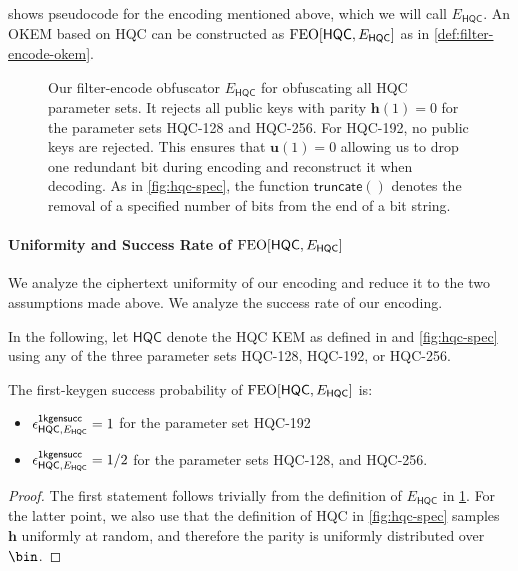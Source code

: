  shows pseudocode for the encoding mentioned above, which we will call $E_\mathsf{HQC}$. An OKEM based on HQC can be constructed as $\textsf{\textnormal{FEO}}[\mathsf{HQC}, E_\mathsf{HQC}]$ as in \cref{def:filter-encode-okem}.

\begin{figure}
    
    \caption[
        Our filter-encode obfuscator $E_\mathsf{HQC}$ for obfuscating all HQC parameter sets.
    ]{
        Our filter-encode obfuscator $E_\mathsf{HQC}$ for obfuscating all HQC parameter sets. It rejects all public keys with parity $\mathbf h(1)=0$ for the parameter sets HQC-128 and HQC-256. For HQC-192, no public keys are rejected. This ensures that $\mathbf u(1)=0$ allowing us to drop one redundant bit during encoding and reconstruct it when decoding. As in \cref{fig:hqc-spec}, the function $\mathsf{truncate}()$ denotes the removal of a specified number of bits from the end of a bit string.
    }
    \label{fig:hqc-encoding}
\end{figure}

\paragraph{Uniformity and Success Rate of $\textsf{\textnormal{FEO}}[\mathsf{HQC}, E_\mathsf{HQC}]$}

We analyze the ciphertext uniformity of our encoding and reduce it to the two assumptions made above. We analyze the success rate of our encoding.

In the following, let $\mathsf{HQC}$ denote the HQC KEM as defined in \cite{NISTPQC-R4:HQC22} and \cref{fig:hqc-spec} using any of the three parameter sets HQC-128, HQC-192, or HQC-256.

\begin{lemma}
\label{lem:hqc-first-keygen-success}
    The first-keygen success probability of $\textsf{\textnormal{FEO}}[\mathsf{HQC}, E_\mathsf{HQC}]$ is:
    \begin{itemize}
        \item $\epsilon^{\mathsf{1kgensucc}}_{\mathsf{HQC}, E_\mathsf{HQC}} = 1$ for the parameter set HQC-192
        \item $\epsilon^{\mathsf{1kgensucc}}_{\mathsf{HQC}, E_\mathsf{HQC}} = 1/2$ for the parameter sets HQC-128, and HQC-256.
    \end{itemize}
\end{lemma}
\begin{proof}
    The first statement follows trivially from the definition of $E_\mathsf{HQC}$ in \cref{fig:hqc-encoding}.
    For the latter point, we also use that the definition of HQC in \cref{fig:hqc-spec} samples $\mathbf h$ uniformly at random, and therefore the parity is uniformly distributed over $\bin$.
\end{proof}

